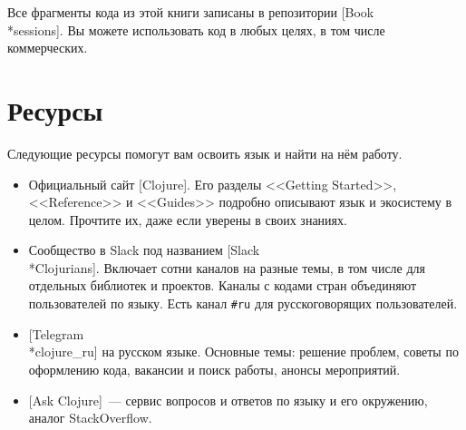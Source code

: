 Все фрагменты кода из этой книги записаны в репозитории
[Book\\*sessions]. Вы
можете использовать код в любых целях, в том числе коммерческих.

\section*{Ресурсы}

Следующие ресурсы помогут вам освоить язык и найти на нём работу.

\begin{itemize}

\item
  Официальный сайт [Clojure]. Его
  разделы <<Getting Started>>, <<Reference>> и <<Guides>> подробно описывают
  язык и экосистему в целом. Прочтите их, даже если уверены в своих знаниях.

\item
  Сообщество в Slack под названием
  [Slack\\*Clo\-ju\-ri\-ans].
  Включает сотни каналов на разные темы, в том числе для отдельных библиотек и
  проектов. Каналы с кодами стран объединяют пользователей по языку. Есть канал
  \verb|#ru| для русскоговорящих пользователей.

\item
  [Telegram\\*cloju\-re\_ru]
  на русском языке. Основные темы: решение проблем, советы по
  оформлению кода, вакансии и поиск работы, анонсы мероприятий.

\item
  [Ask Clojure]~---
  сервис вопросов и ответов по языку и его окружению, аналог
  StackOverflow.

\end{itemize}
